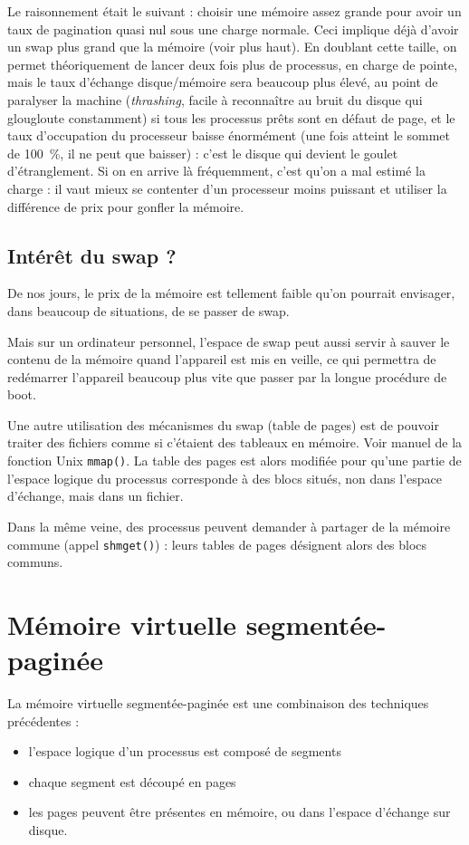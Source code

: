 \begin{multicols}{2}
Le raisonnement était le suivant : choisir une mémoire assez grande
pour avoir un taux de pagination quasi nul sous une charge
normale. Ceci implique déjà d'avoir un swap plus grand que la mémoire
(voir plus haut).  En doublant cette taille, on permet théoriquement
de lancer deux fois plus de processus, en charge de pointe, mais le
taux d'échange disque/mémoire sera beaucoup plus élevé, au point de
paralyser la machine ({\em thrashing}, facile à reconnaître au bruit
du disque qui glougloute constamment) si tous les processus prêts sont
en défaut de page, et le taux d'occupation du processeur baisse
énormément (une fois atteint le sommet de 100~\%, il ne peut que
baisser) : c'est le disque qui devient le goulet d'étranglement.  Si
on en arrive là fréquemment, c'est qu'on a mal estimé la charge : il
vaut mieux se contenter d'un processeur moins puissant et utiliser la
différence de prix pour gonfler la mémoire.


\subsection{Intérêt du swap ?}

De nos jours, le prix de la mémoire est tellement faible qu'on pourrait
envisager, dans beaucoup de situations, de se passer de swap.

Mais sur un ordinateur personnel, l'espace de swap peut aussi servir à sauver
le contenu de la mémoire quand l'appareil est mis en veille, ce qui permettra
de redémarrer l'appareil beaucoup plus vite que passer par la longue procédure de boot.

Une autre utilisation des mécanismes du swap (table de pages) est de
pouvoir traiter des fichiers comme si c'étaient des tableaux en
mémoire. Voir manuel de la fonction Unix \texttt{mmap()}.  La table
des pages est alors modifiée pour qu'une partie de l'espace logique du processus
corresponde à des blocs situés, non dans l'espace d'échange, mais dans un fichier.

Dans la même veine, des processus peuvent demander à partager de la
mémoire commune (appel \texttt{shmget()}) : leurs tables de pages
désignent alors  des blocs communs.



\section{Mémoire virtuelle segmentée-paginée}


La mémoire virtuelle segmentée-paginée est une combinaison des techniques précédentes :
\begin{itemize}
\item l'espace logique d'un processus est composé de segments
\item chaque segment est découpé en pages
\item les pages peuvent être présentes en mémoire, ou dans l'espace
  d'échange sur disque.
\end{itemize}


\end{multicols}
